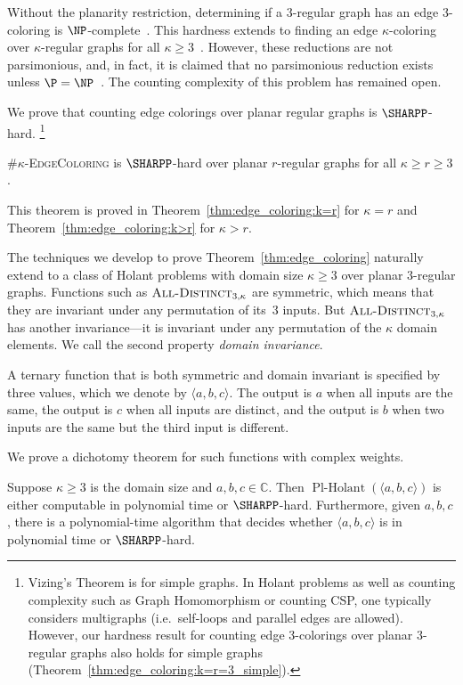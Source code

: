 \documentclass[11pt]{article}
\newcommand{\PlHolant}{\operatorname{Pl-Holant}}
\newcommand{\AllDistinct}{\textsc{All-Distinct}}
\begin{document}
Without the planarity restriction,
determining if a $3$-regular graph has an edge $3$-coloring is $\NP$-complete~\cite{Hol81}.
This hardness extends to finding an edge $\kappa$-coloring over $\kappa$-regular graphs for all $\kappa \ge 3$~\cite{LG83}.
However, these reductions are not parsimonious,
and, in fact, it is claimed that no parsimonious reduction exists unless $\P = \NP$~\cite[p.~118]{Wel93}.
The counting complexity of this problem has remained open.

We prove that counting edge colorings over planar regular graphs is $\SHARPP$-hard.%
\footnote{Vizing's Theorem is for simple graphs.
In Holant problems as well as counting complexity such as Graph Homomorphism or counting CSP,
one typically considers multigraphs (i.e.~self-loops and parallel edges are allowed).
However, our hardness result for counting edge $3$-colorings over planar $3$-regular graphs also holds for simple graphs (Theorem~\ref{thm:edge_coloring:k=r=3_simple}).}

\begin{theorem} \label{thm:edge_coloring}
 \#$\kappa$-\textsc{EdgeColoring} is $\SHARPP$-hard over planar $r$-regular graphs for all $\kappa \ge r \ge 3$.
\end{theorem}

\noindent
This theorem is proved in Theorem~\ref{thm:edge_coloring:k=r} for $\kappa = r$
and Theorem~\ref{thm:edge_coloring:k>r} for $\kappa > r$.

The techniques we develop to prove Theorem~\ref{thm:edge_coloring} naturally extend to a class of Holant problems with domain size $\kappa \ge 3$ over planar $3$-regular graphs.
Functions such as $\AllDistinct_{3,\kappa}$ are symmetric,
which means that they are invariant under any permutation of its~$3$ inputs.
But $\AllDistinct_{3,\kappa}$ has another invariance---it is invariant under any permutation of the $\kappa$ domain elements.
We call the second property \emph{domain invariance}.

A ternary function that is both symmetric and domain invariant is specified by three values,
which we denote by $\langle a,b,c \rangle$.
The output is $a$ when all inputs are the same,
the output is $c$ when all inputs are distinct,
and the output is $b$ when two inputs are the same but the third input is different.

We prove a dichotomy theorem for such functions with complex weights.

\begin{theorem} \label{thm:dichotomy:simple}
 Suppose $\kappa \ge 3$ is the domain size and $a,b,c \in \mathbb{C}$.
 Then $\PlHolant(\langle a,b,c \rangle)$ is either computable in polynomial time or $\SHARPP$-hard.
 Furthermore, given $a,b,c$, there is a polynomial-time algorithm that decides whether $\langle a,b,c \rangle$ is in polynomial time or $\SHARPP$-hard.
\end{theorem}
\end{document}
